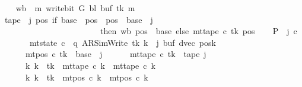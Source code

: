 \begin{isabellebody}
\ \ \isamarkupfalse%
\ {\isacharquery}{\kern0pt}wb\ {\isacharequal}{\kern0pt}\ {\isachardoublequoteopen}{\isasymlambda}m{\isachardot}{\kern0pt}\ write{\isacharunderscore}{\kern0pt}bit\ {\isacharquery}{\kern0pt}G\ {\isacharquery}{\kern0pt}bl\ {\isacharparenleft}{\kern0pt}buf\ tk{\isacharparenright}{\kern0pt}\ m{\isachardoublequoteclose}\isanewline
\ \ \isamarkupfalse%
\ {\isacharquery}{\kern0pt}tape\ {\isacharequal}{\kern0pt}\ {\isachardoublequoteopen}{\isasymlambda}j\ pos{\isachardot}{\kern0pt}\ if\ base\ {\isasymle}\ pos\ {\isasymand}\ pos\ {\isacharless}{\kern0pt}\ base\ {\isacharplus}{\kern0pt}\ j\isanewline
\ \ \ \ \ \ \ \ \ \ \ \ \ \ \ \ \ \ \ \ \ \ \ \ then\ {\isacharquery}{\kern0pt}wb\ {\isacharparenleft}{\kern0pt}pos\ {\isacharminus}{\kern0pt}\ base{\isacharparenright}{\kern0pt}\ else\ mt{\isacharunderscore}{\kern0pt}tape\ c{}\ tk\ pos{\isachardoublequoteclose}\isanewline
\ \ \isamarkupfalse%
\ {\isacharquery}{\kern0pt}P\ {\isacharequal}{\kern0pt}\ {\isachardoublequoteopen}{\isasymlambda}j\ c{\isachardot}{\kern0pt}\isanewline
\ \ \ \ \ \ \ mt{\isacharunderscore}{\kern0pt}state\ c\ {\isacharequal}{\kern0pt}\ {\isacharparenleft}{\kern0pt}q{\isacharcomma}{\kern0pt}\ AR{\isacharunderscore}{\kern0pt}SimWrite{\isacharcomma}{\kern0pt}\ tk{\isacharcomma}{\kern0pt}\ {\isacharquery}{\kern0pt}k\ {\isacharplus}{\kern0pt}\ j{\isacharcomma}{\kern0pt}\ buf{\isacharcomma}{\kern0pt}\ dvec{\isacharcomma}{\kern0pt}\ posk{\isacharparenright}{\kern0pt}\isanewline
\ \ \ \ \ {\isasymand}\ mt{\isacharunderscore}{\kern0pt}pos\ c\ tk\ {\isacharequal}{\kern0pt}\ base\ {\isacharplus}{\kern0pt}\ j\isanewline
\ \ \ \ \ {\isasymand}\ mt{\isacharunderscore}{\kern0pt}tape\ c\ tk\ {\isacharequal}{\kern0pt}\ {\isacharquery}{\kern0pt}tape\ j\isanewline
\ \ \ \ \ {\isasymand}\ {\isacharparenleft}{\kern0pt}{\isasymforall}k{\isacharprime}{\kern0pt}{\isachardot}{\kern0pt}\ k{\isacharprime}{\kern0pt}\ {\isasymnoteq}\ tk\ {\isasymlongrightarrow}\ mt{\isacharunderscore}{\kern0pt}tape\ c\ k{\isacharprime}{\kern0pt}\ {\isacharequal}{\kern0pt}\ mt{\isacharunderscore}{\kern0pt}tape\ c{}\ k{\isacharprime}{\kern0pt}{\isacharparenright}{\kern0pt}\isanewline
\ \ \ \ \ {\isasymand}\ {\isacharparenleft}{\kern0pt}{\isasymforall}k{\isacharprime}{\kern0pt}{\isachardot}{\kern0pt}\ k{\isacharprime}{\kern0pt}\ {\isasymnoteq}\ tk\ {\isasymlongrightarrow}\ mt{\isacharunderscore}{\kern0pt}pos\ c\ k{\isacharprime}{\kern0pt}\ {\isacharequal}{\kern0pt}\ mt{\isacharunderscore}{\kern0pt}pos\ c{}\ k{\isacharprime}{\kern0pt}{\isacharparenright}{\kern0pt}{\isachardoublequoteclose}\isanewline

\end{isabellebody}
